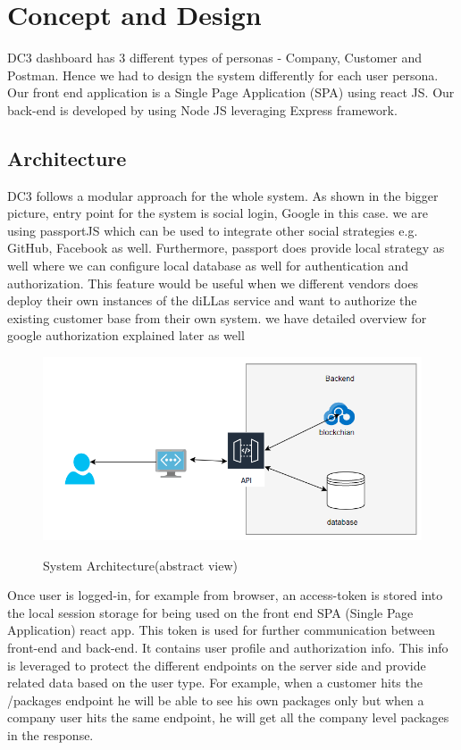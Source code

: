 \chapter{Concept and Design}
\label{cha:conceptanddesign}

DC3 dashboard has 3 different types of personas - Company, Customer and Postman. Hence we had to design the system differently for each user persona. Our front end application is a Single Page Application (SPA) using react JS. Our back-end is developed by using Node JS leveraging Express framework. 

\section{Architecture}
DC3 follows a modular approach for the whole system. As shown in the bigger picture, entry point for the system is social login, Google in this case. we are using passportJS which can be used to integrate other social strategies e.g. GitHub, Facebook as well. Furthermore, passport does provide local strategy as well where we can configure local database as well for authentication and authorization. This feature would be useful when we different vendors does deploy their own instances of the diLLas service and want to authorize the existing customer base from their own system. we have detailed overview for google authorization explained later as well 

\begin{figure}[!ht]
	\centering
	\includegraphics[width=1 \textwidth]{images/bigger_picture.png}\\
	\caption{System Architecture(abstract view)}
	\label{fig:System Architecture(abstract view)}
\end{figure}

Once user is logged-in, for example from browser, an access-token is stored into the local session storage for being used on the front end SPA (Single Page Application) react app.  This token is used for further communication between front-end and back-end. It contains user profile and authorization info. This info is leveraged to protect the different endpoints on the server side and provide related data based on the user type. For example, when a customer hits the /packages endpoint he will be able to see his own packages only but when a company user hits the same endpoint, he will get all the company level packages in the response.

